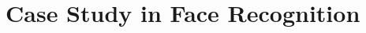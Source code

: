 \begin{comment}

RQ 1:How can we develop a visualization tool to improve the understanding of the behaviour of an artificial neural network?

RO 1.1: Examine existing tools in order to uncover shortcomings.
RO 1.2: Identify visualization techniques that can be used to improve the understanding of an artificial neural network.
RO 1.3: Develop a tool that incorporates the techniques found in 1.2 and addresses the shortcomings identified in 1.1.

\end{comment}





\section{Case Study in Face Recognition}

